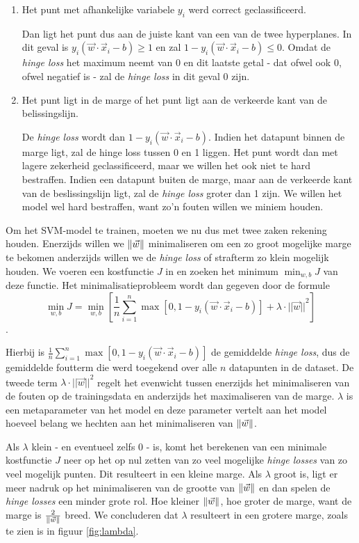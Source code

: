 \documentclass[TeamE-eindrapport]{subfiles}
\begin{document}
	\begin{enumerate}
		\item Het punt met afhankelijke variabele \(y_i\) werd correct geclassificeerd.
		
		Dan ligt het punt dus aan de juiste kant van een van de twee hyperplanes. In dit geval is \(y_i(\vec{w}\cdot\vec{x}_i-b)\ge1\) en zal \(1 - y_i(\vec{w}\cdot\vec{x}_i-b)\le0\). Omdat de \textit{hinge loss} het maximum neemt van 0 en dit laatste getal - dat ofwel ook 0, ofwel negatief is - zal de \textit{hinge loss} in dit geval 0 zijn.
		
		\item Het punt ligt in de marge of het punt ligt aan de verkeerde kant van de belissingslijn. 
		
		De \textit{hinge loss} wordt dan \(1 - y_i(\vec{w}\cdot\vec{x}_i - b)\). Indien het datapunt binnen de marge ligt, zal de hinge loss tussen 0 en 1 liggen. Het punt wordt dan met lagere zekerheid geclassificeerd, maar we willen het ook niet te hard bestraffen. Indien een datapunt buiten de marge, maar aan de verkeerde kant van de beslissingslijn ligt, zal de \textit{hinge loss} groter dan 1 zijn. We willen het model wel hard bestraffen, want zo'n fouten willen we miniem houden.
	\end{enumerate}
	
	Om het SVM-model te trainen, moeten we nu dus met twee zaken rekening houden. Enerzijds willen we \(\left\| \vec{w} \right\|\) minimaliseren om een zo groot mogelijke marge te bekomen anderzijds willen we de \textit{hinge loss} of strafterm zo klein mogelijk houden. We voeren een kostfunctie \(J\) in en zoeken het minimum \(\min_{w, b}J\) van deze functie. Het minimalisatieprobleem wordt dan gegeven door de formule \[\min_{w, b}J=\min_{w, b}\left[\frac{1}{n}\sum_{i=1}^n{\max{[0,1-y_i(\vec{w}\cdot\vec{x}_i-b)]}} + \lambda\cdot{||\vec{w}||}^2\right]\].
	
	Hierbij is \(\frac{1}{n}\sum_{i=1}^n{\max{[0,1-y_i(\vec{w}\cdot\vec{x}_i-b)]}}\) de gemiddelde \textit{hinge loss}, dus de gemiddelde foutterm die werd toegekend over alle \(n\) datapunten in de dataset. De tweede term \(\lambda\cdot{||\vec{w}||}^2\) regelt het evenwicht tussen enerzijds het minimaliseren van de fouten op de trainingsdata en anderzijds het maximaliseren van de marge. \(\lambda\) is een metaparameter van het model en deze parameter vertelt aan het model hoeveel belang we hechten aan het minimaliseren van \(\left\| \vec{w} \right\|\). 
	
	Als \(\lambda\) klein - en eventueel zelfs \(0\) - is, komt het berekenen van een minimale kostfunctie $J$ neer op het op nul zetten van zo veel mogelijke \textit{hinge losses} van zo veel mogelijk punten. Dit resulteert in een kleine marge. Als \(\lambda\) groot is, ligt er meer nadruk op het minimaliseren van de grootte van \(\left\| \vec{w} \right\|\) en dan spelen de \textit{hinge losses} een minder grote rol. Hoe kleiner \(\left\| \vec{w} \right\|\), hoe groter de marge, want de marge is \(\frac{2}{\left\| \vec{w} \right\|}\) breed. We concluderen dat \(\lambda\) resulteert in een grotere marge, zoals te zien is in figuur \ref{fig:lambda}.
	
\end{document}

